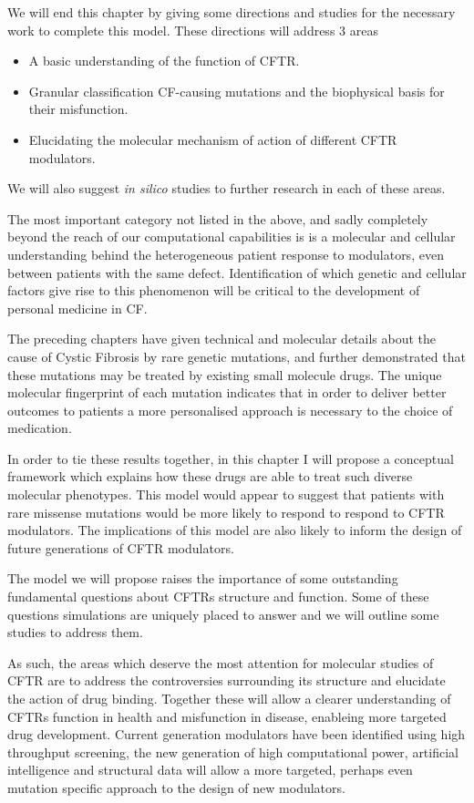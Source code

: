 We will end this chapter by giving some directions and studies for the necessary work to complete this model. These directions will address 3 areas 

\begin{itemize}
	\item A basic understanding of the function of CFTR.
	\item Granular classification CF-causing mutations and the biophysical basis for their misfunction.
	\item Elucidating the molecular mechanism of action of different CFTR modulators. 
\end{itemize}

We will also suggest \textit{in silico} studies to further research in each of these areas.

The most important category not listed in the above, and sadly completely beyond the reach of our computational capabilities is is a molecular and cellular understanding behind the heterogeneous patient response to modulators, even between patients with the same defect. Identification of which genetic and cellular factors give rise to this phenomenon will be critical to the development of personal medicine in CF. 

The preceding chapters have given technical and molecular details about the cause of Cystic Fibrosis by rare genetic mutations, and further demonstrated that these mutations may be treated by existing small molecule drugs. The unique molecular fingerprint of each mutation indicates that in order to deliver better outcomes to patients a more personalised approach is necessary to the choice of medication. 

In order to tie these results together, in this chapter I will propose a conceptual framework which explains how these drugs are able to treat such diverse molecular phenotypes. This model would appear to suggest that patients with rare missense mutations would be more likely to respond to respond to CFTR modulators. The implications of this model are also likely to inform the design of future generations of CFTR modulators. 

The model we will propose raises the importance of some outstanding fundamental questions about CFTRs structure and function. Some of these questions simulations are uniquely placed to answer and we will outline some studies to address them. 

As such, the areas which deserve the most attention for molecular studies of CFTR are to address the controversies surrounding its structure and elucidate the action of drug binding. Together these will allow a clearer understanding of CFTRs function in health and misfunction in disease, enableing more targeted drug development. Current generation modulators have been identified using high throughput screening, the new generation of high computational power, artificial intelligence and structural data will allow a more targeted, perhaps even mutation specific approach to the design of new modulators.

